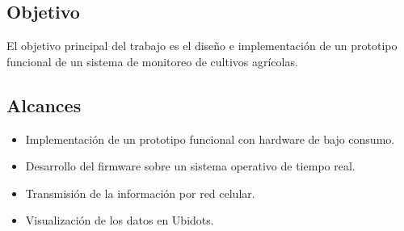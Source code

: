 \subsection{Objetivo}
El objetivo principal del trabajo es el diseño e implementación de un prototipo funcional de un sistema de monitoreo de cultivos agrícolas.
\subsection{Alcances}

\begin{itemize}
  \item Implementación de un prototipo funcional con hardware de bajo consumo. 	
  \item Desarrollo del firmware sobre un sistema operativo de tiempo real.
  \item Transmisión de la información por red celular.
  \item Visualización de los datos en Ubidots.
\end{itemize}